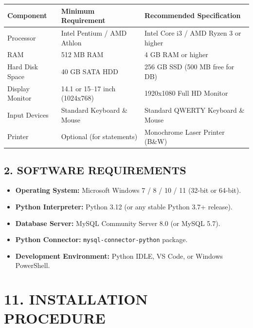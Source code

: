 \documentclass[12pt,a4paper]{article}
\begin{document}
\vspace{0.6em}
\begin{center}
\renewcommand{\arraystretch}{1.3}
\small
\begin{tabular}{|l|p{5.5cm}|p{6cm}|}
\hline
\textbf{Component} & \textbf{Minimum Requirement} & \textbf{Recommended Specification} \\ \hline
Processor & Intel Pentium / AMD Athlon & Intel Core i3 / AMD Ryzen 3 or higher \\ \hline
RAM & 512 MB RAM & 4 GB RAM or higher \\ \hline
Hard Disk Space & 40 GB SATA HDD & 256 GB SSD (500 MB free for DB) \\ \hline
Display Monitor & 14.1 or 15--17 inch (1024x768) & 1920x1080 Full HD Monitor \\ \hline
Input Devices & Standard Keyboard \& Mouse & Standard QWERTY Keyboard \& Mouse \\ \hline
Printer & Optional (for statements) & Monochrome Laser Printer (B\&W) \\ \hline
\end{tabular}
\end{center}

\vspace{1.5em}
\subsection*{2. SOFTWARE REQUIREMENTS}
\begin{itemize}
    \item \textbf{Operating System:} Microsoft Windows 7 / 8 / 10 / 11 (32-bit or 64-bit).
    \item \textbf{Python Interpreter:} Python 3.12 (or any stable Python 3.7+ release).
    \item \textbf{Database Server:} MySQL Community Server 8.0 (or MySQL 5.7).
    \item \textbf{Python Connector:} \texttt{mysql-connector-python} package.
    \item \textbf{Development Environment:} Python IDLE, VS Code, or Windows PowerShell.
\end{itemize}

\clearpage

\hypertarget{sec:installation}{}\label{sec:installation}
\section*{11. INSTALLATION PROCEDURE}
\vspace{0.5em}
\end{document}
